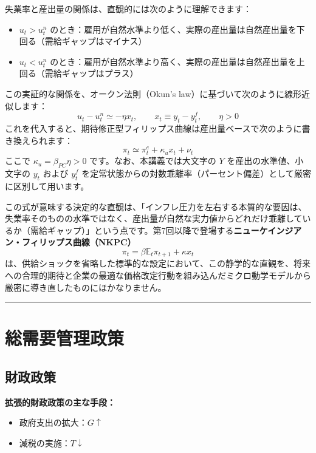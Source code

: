 \documentclass[
  japanese,
  lualatex,
  ja=standard,
  12pt,
  a4paper]{ltjsarticle}
\providecommand{\tightlist}{%
  \setlength{\itemsep}{0pt}\setlength{\parskip}{0pt}}
\begin{document}
失業率と産出量の関係は、直観的には次のように理解できます：

\begin{itemize}
\tightlist
\item
  \(u_t>u_t^n\)
  のとき：雇用が自然水準より低く、実際の産出量は自然産出量を下回る（需給ギャップはマイナス）
\item
  \(u_t<u_t^n\)
  のとき：雇用が自然水準より高く、実際の産出量は自然産出量を上回る（需給ギャップはプラス）
\end{itemize}

この実証的な関係を、オークン法則（Okun's
law）に基づいて次のように線形近似します： \[
u_t-u_t^n \simeq -\eta x_t,\qquad x_t\equiv y_t-y_t^f,\qquad \eta>0
\]
これを代入すると、期待修正型フィリップス曲線は産出量ベースで次のように書き換えられます：
\[
\pi_t
\simeq
\pi_t^e+\kappa_u x_t+\nu_t
\] ここで \(\kappa_u=\beta_{PC}\eta>0\) です。なお、本講義では大文字の
\(Y\) を産出の水準値、小文字の \(y_t\) および \(y_t^f\)
を定常状態からの対数乖離率（パーセント偏差）として厳密に区別して用います。

この式が意味する決定的な直観は、「インフレ圧力を左右する本質的な要因は、失業率そのものの水準ではなく、産出量が自然な実力値からどれだけ乖離しているか（需給ギャップ）」という点です。第7回以降で登場する\textbf{ニューケインジアン・フィリップス曲線（NKPC）}
\[
\pi_t=\beta\mathbb{E}_t\pi_{t+1}+\kappa x_t
\]
は、供給ショックを省略した標準的な設定において、この静学的な直観を、将来への合理的期待と企業の最適な価格改定行動を組み込んだミクロ動学モデルから厳密に導き直したものにほかなりません。

\begin{center}\rule{0.5\linewidth}{0.5pt}\end{center}

\section{総需要管理政策}\label{ux7dcfux9700ux8981ux7ba1ux7406ux653fux7b56}

\subsection{財政政策}\label{ux8ca1ux653fux653fux7b56}

\textbf{拡張的財政政策の主な手段：}

\begin{itemize}
\tightlist
\item
  政府支出の拡大：\(G \uparrow\)
\item
  減税の実施：\(T \downarrow\)
\end{itemize}
\end{document}
